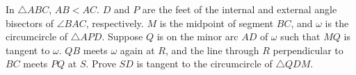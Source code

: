In $\triangle ABC$, $AB<AC$. $D$ and $P$ are the feet of the internal and external angle bisectors of $\angle BAC$, respectively. $M$ is the midpoint of segment $BC$, and $\omega$ is the circumcircle of $\triangle APD$. Suppose $Q$ is on the minor arc $AD$ of $\omega$ such that $MQ$ is tangent to $\omega$. $QB$ meets $\omega$ again at $R$, and the line through $R$ perpendicular to $BC$ meets $PQ$ at $S$.  Prove $SD$ is tangent to the circumcircle of $\triangle QDM$.

